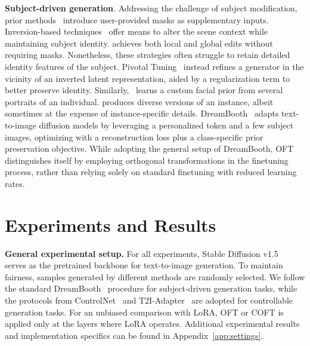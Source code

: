 \begin{itemize}[leftmargin=*,nosep]
\begin{itemize}[leftmargin=*,nosep]

\textbf{Subject-driven generation}. Addressing the challenge of subject modification, prior methods~\cite{avrahami2022blended,nichol2022glide} introduce user-provided masks as supplementary inputs. Inversion-based techniques~\cite{choi2021ilvr,dhariwal2021diffusion,ramesh2022hierarchical,gal2022image} offer means to alter the scene context while maintaining subject identity. \cite{hertz2022prompt} achieves both local and global edits without requiring masks. Nonetheless, these strategies often struggle to retain detailed identity features of the subject. Pivotal Tuning~\cite{roich2022pivotal} instead refines a generator in the vicinity of an inverted latent representation, aided by a regularization term to better preserve identity. Similarly,~\cite{nitzan2022mystyle} learns a custom facial prior from several portraits of an individual. \cite{casanova2021instance} produces diverse versions of an instance, albeit sometimes at the expense of instance-specific details. DreamBooth~\cite{ruiz2023dreambooth} adapts text-to-image diffusion models by leveraging a personalized token and a few subject images, optimizing with a reconstruction loss plus a class-specific prior preservation objective. While adopting the general setup of DreamBooth, OFT distinguishes itself by employing orthogonal transformations in the finetuning process, rather than relying solely on standard finetuning with reduced learning rates.

\section{Experiments and Results}

\textbf{General experimental setup.} For all experiments, Stable Diffusion v1.5~\cite{rombach2022high} serves as the pretrained backbone for text-to-image generation. To maintain fairness, samples generated by different methods are randomly selected. We follow the standard DreamBooth~\cite{ruiz2023dreambooth} procedure for subject-driven generation tasks, while the protocols from ControlNet~\cite{zhang2023adding} and T2I-Adapter~\cite{mou2023t2i} are adopted for controllable generation tasks. For an unbiased comparison with LoRA, OFT or COFT is applied only at the layers where LoRA operates. Additional experimental results and implementation specifics can be found in Appendix~\ref{app:settings}.


\end{itemize}
\end{itemize}
